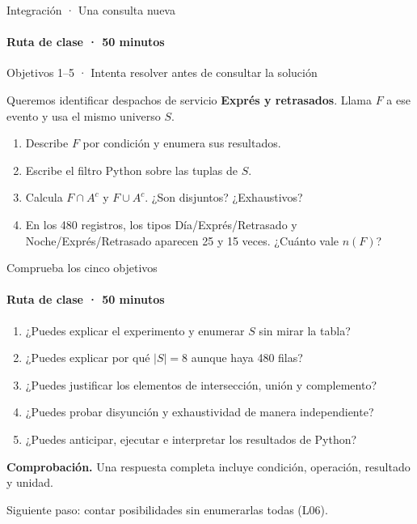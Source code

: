 \documentclass[aspectratio=169,11pt,spanish]{beamer}
\newcommand{\objetivo}[1]{{\small\color{TecAzul}#1\par}\medskip}
\newcommand{\verifica}[1]{\par\smallskip\textbf{Comprobación.} #1\par}
\begin{document}
\begin{frame}{Integración · Una consulta nueva}
\framesubtitle{Ruta de clase · 50 minutos}
\objetivo{Objetivos 1--5 · Intenta resolver antes de consultar la solución}
Queremos identificar despachos de servicio \textbf{Exprés y retrasados}. Llama $F$ a ese evento y usa el mismo universo $S$.
\begin{enumerate}
\item Describe $F$ por condición y enumera sus resultados.
\item Escribe el filtro Python sobre las tuplas de $S$.
\item Calcula $F\cap A^c$ y $F\cup A^c$. ¿Son disjuntos? ¿Exhaustivos?
\item En los 480 registros, los tipos Día/Exprés/Retrasado y Noche/Exprés/Retrasado aparecen 25 y 15 veces. ¿Cuánto vale $n(F)$?
\end{enumerate}
\hyperlink{solucion}{}
\end{frame}

\begin{frame}{Comprueba los cinco objetivos}
\framesubtitle{Ruta de clase · 50 minutos}
\begin{enumerate}
\item ¿Puedes explicar el experimento y enumerar $S$ sin mirar la tabla?
\item ¿Puedes explicar por qué $|S|=8$ aunque haya 480 filas?
\item ¿Puedes justificar los elementos de intersección, unión y complemento?
\item ¿Puedes probar disyunción y exhaustividad de manera independiente?
\item ¿Puedes anticipar, ejecutar e interpretar los resultados de Python?
\end{enumerate}
\verifica{Una respuesta completa incluye condición, operación, resultado y unidad.}
Siguiente paso: contar posibilidades sin enumerarlas todas (L06).
\end{frame}
\end{document}
